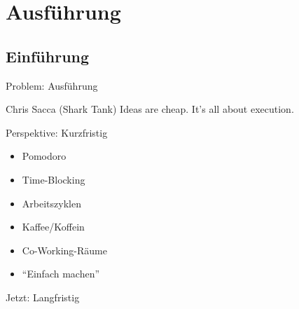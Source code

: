 \section{Ausführung}

\subsection{Einführung}

\begin{frame}[c]{Problem: Ausführung}
    \large
    \begin{aquote}{Chris Sacca (Shark Tank)}
        Ideas are cheap. It's all about execution.
    \end{aquote}
\end{frame}


\begin{frame}[c]{Perspektive: Kurzfristig}
    \large
    \begin{itemize}
        \item Pomodoro
        \item Time-Blocking
        \item Arbeitszyklen
        \item Kaffee/Koffein
        \item Co-Working-Räume
        \item \enquote{Einfach machen}
    \end{itemize}
\end{frame}


\addtocounter{framenumber}{1}
\begin{frame}[standout]
    \Large
    Jetzt: Langfristig
\end{frame}

%
%
%
%
%


